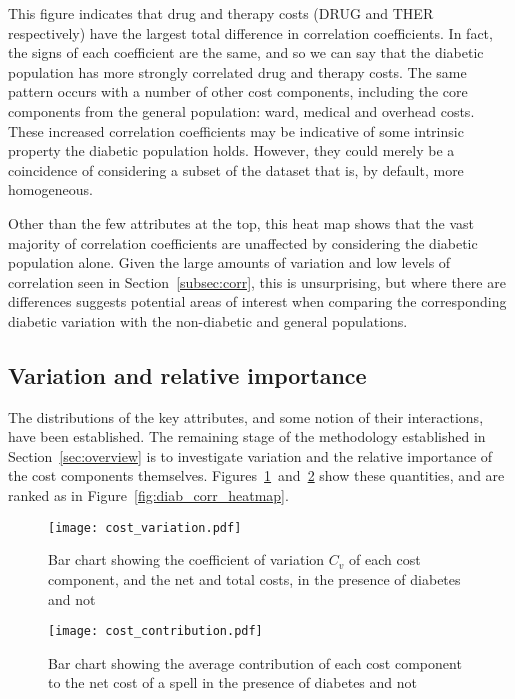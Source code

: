 This figure indicates that drug and therapy costs (DRUG and THER respectively)
have the largest total difference in correlation coefficients. In fact, the
signs of each coefficient are the same, and so we can say that the diabetic
population has more strongly correlated drug and therapy costs. The same pattern
occurs with a number of other cost components, including the core components
from the general population: ward, medical and overhead costs. These increased
correlation coefficients may be indicative of some intrinsic property the
diabetic population holds. However, they could merely be a coincidence of
considering a subset of the dataset that is, by default, more homogeneous.

Other than the few attributes at the top, this heat map shows that the vast
majority of correlation coefficients are unaffected by considering the diabetic
population alone. Given the large amounts of variation and low levels of
correlation seen in Section~\ref{subsec:corr}, this is unsurprising, but where
there are differences suggests potential areas of interest when comparing the
corresponding diabetic variation with the non-diabetic and general populations.


\subsection{Variation and relative importance}\label{subsec:diab_variation}

The distributions of the key attributes, and some notion of their interactions,
have been established. The remaining stage of the methodology established in
Section~\ref{sec:overview} is to investigate variation and the relative
importance of the cost components themselves.
Figures~\ref{fig:diab_variation}~and~\ref{fig:diab_contribution} show these
quantities, and are ranked as in Figure~\ref{fig:diab_corr_heatmap}.

\begin{figure}
    \centering
    \texttt{[image: cost\_variation.pdf]}
    \caption{%
        Bar chart showing the coefficient of variation \(C_{v}\) of each cost
        component, and the net and total costs, in the presence of diabetes and
        not
    }\label{fig:diab_variation}
\end{figure}

\begin{figure}
    \centering
    \texttt{[image: cost\_contribution.pdf]}
    \caption{%
        Bar chart showing the average contribution of each cost component
        to the net cost of a spell in the presence of diabetes and not
    }\label{fig:diab_contribution}
\end{figure}

